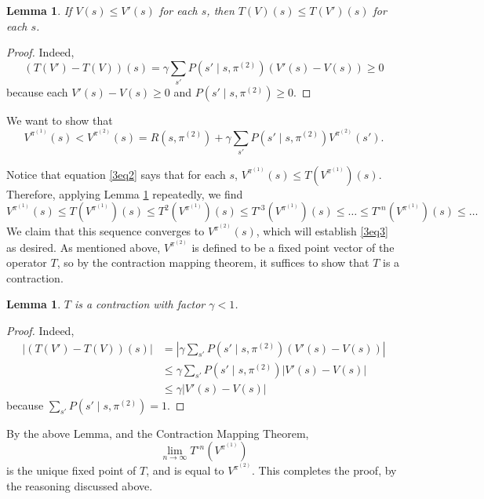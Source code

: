 \documentclass[12pt]{article}
\newtheorem{lemma}[thm]{Lemma}
\theoremstyle{remark}
\begin{document}
\begin{lemma}\label{3lem1}
If $V(s) \leq V'(s)$ for each $s$, then $T(V)(s) \leq T(V')(s)$ for each $s$. 
\end{lemma}

\begin{proof}
Indeed, 
\[
(T(V')-T(V))(s) = \gamma \sum_{s'} P(s' \mid s, \pi^{(2)}) (V'(s) - V(s)) \geq 0
\]
because each $V'(s)-V(s) \geq 0$ and $P(s' \mid s, \pi^{(2)}) \geq 0$. 
\end{proof}

We want to show that 
\begin{equation}\label{3eq3}
V^{\pi^{(1)}}(s)  < V^{\pi^{(2)}} (s)  = R(s, \pi^{(2)}) + \gamma \sum_{s'} P(s' \mid s, \pi^{(2)} ) V^{\pi^{(2)}}(s'). 
\end{equation}

Notice that equation \eqref{3eq2} says that for each $s$, $V^{\pi^{(1)}}(s) \leq T(V^{\pi^{(1)}})(s)$. Therefore, applying Lemma \ref{3lem1} repeatedly, we find 
\[
V^{\pi^{(1)}}(s) \leq T(V^{\pi^{(1)}})(s) \leq T^2(V^{\pi^{(1)}})(s) \leq T^{\circ 3}(V^{\pi^{(1)}})(s) \leq \ldots \leq T^{\circ n}(V^{\pi^{(1)}})(s) \leq \ldots
\]
We claim that this sequence converges to $V^{\pi^{(2)}}(s)$, which will establish \eqref{3eq3} as desired. As mentioned above, $V^{\pi^{(2)}}$ is defined to be a fixed point vector of the operator $T$, so by the contraction mapping theorem, it suffices to show that $T$ is a contraction.

\begin{lemma}
$T$ is a contraction with factor $\gamma < 1$. 
\end{lemma}

\begin{proof}
Indeed, 
\begin{align*}
|(T(V')-T(V))(s)| & = |\gamma \sum_{s'} P(s' \mid s, \pi^{(2)}) (V'(s) - V(s))| \\
&\leq \gamma \sum_{s'} P(s' \mid s, \pi^{(2)}) |V'(s)-V(s)| \\
&\leq \gamma |V'(s)-V(s)|
\end{align*}
because $\sum_{s'} P(s' \mid s, \pi^{(2)}) = 1$. 
\end{proof}

By the above Lemma, and the Contraction Mapping Theorem, 
\[
\lim_{n \rightarrow \infty} T^{\circ n}(V^{\pi^{(1)}}) 
\]
is the unique fixed point of $T$, and is equal to $V^{\pi^{(2)}}$. This completes the proof, by the reasoning discussed above. \\ 
\end{document}
